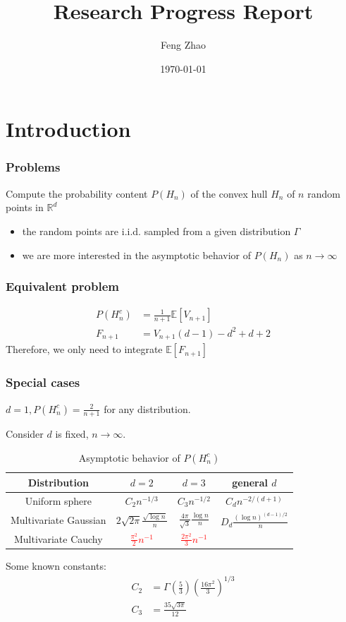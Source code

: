 \documentclass{beamer}
\title{Research Progress Report}
\author{Feng Zhao}
\date{\today}
\begin{document}
\begin{frame}
	\titlepage
\end{frame}


\section{Introduction}

\begin{frame}
\frametitle{Problems}
Compute the probability content $P(H_n)$ of the convex hull $H_n$
of $n$ random points in $\mathbb{R}^d$
\begin{itemize}
\item the random points are i.i.d. sampled from a given distribution $\Gamma$
\item we are more interested in the asymptotic behavior of $P(H_n)$
as $n\to\infty$
\end{itemize}
\end{frame}
\begin{frame}
	\frametitle{Equivalent problem}
    \begin{align}
        P(H_n^c) & = \frac{1}{n+1}\mathbb{E}[V_{n+1}]\\
        F_{n+1} & = V_{n+1} (d-1) - d^2 + d + 2
    \end{align}   
    Therefore, we only need to integrate
    $\mathbb{E}[F_{n+1}]$
\end{frame}   
\begin{frame}
    \frametitle{Special cases}
    $d=1,P(H_n^c) = \frac{2}{n+1}$ for any distribution.
    
    Consider $d$ is fixed, $n\to \infty$.
    \begin{table}
        \begin{tabular}{|c|c|c|c|}
            \hline
            Distribution & $d=2$ & $d=3$ &  general $d$ \\
            \hline
            Uniform sphere & $C_2 n^{-1/3}$ & $C_3 n^{-1/2}$ &
            $C_{d} n^{-2/(d+1)}$ \\
            \hline
            Multivariate Gaussian &
            $2\sqrt{2\pi}\frac{\sqrt{\log n}}{n}$
            & $\frac{4\pi}{\sqrt{3}}\frac{\log n}{n}$ & $D_d\frac{(\log n)^{(d-1)/2}}{n}$ \\
            \hline
            Multivariate Cauchy & 
            \textcolor{red}{$\frac{\pi^2}{2}n^{-1}$} &
            \textcolor{red}{$\frac{2\pi^2}{3}n^{-1}$} &\\
            \hline
        \end{tabular}
        \caption{Asymptotic behavior of $P(H_n^c)$}
    \end{table}
    Some known constants:
    \begin{align*}
    C_2 &= \Gamma\left(\frac{5}{3}\right) \left(\frac{16\pi^2}{3}
    \right)^{1/3} \\
    C_3 &= \frac{35\sqrt{3\pi}}{12}
    \end{align*}
\end{frame}
\end{document}
